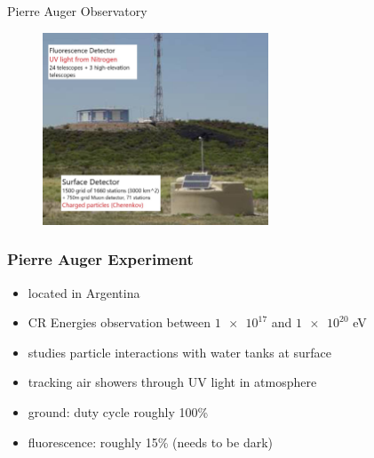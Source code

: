 \documentclass[aspectratio=1610, 9pt]{beamer}
\begin{document}
\begin{frame}{Pierre Auger Observatory}
  \begin{figure}
    \centering
    \includegraphics[width=0.6\textwidth]{plots/auger_both.jpg}
  \end{figure}
\end{frame}

\begin{frame}\frametitle{Pierre Auger Experiment}
  \begin{itemize}
    \item located in Argentina
    \item CR Energies observation between $\num{1e17}$ and $\num{1e20}$ eV
    \item studies particle interactions with water tanks at surface
    \item tracking air showers through UV light in atmosphere
    \item ground: duty cycle roughly 100\%
    \item fluorescence: roughly 15\% (needs to be dark)
  \end{itemize}
\end{frame}


\end{document}
